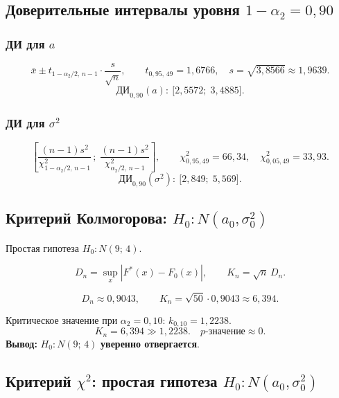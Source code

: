 \documentclass[12pt,a4paper]{article}
\newcommand{\xbar}{\bar{x}}
\begin{document}
	\subsection{Доверительные интервалы уровня \texorpdfstring{$1-\alpha_2 = 0{,}90$}{0.90}}
	
	\subsubsection*{ДИ для $a$}
	\[
	\xbar \pm t_{1-\alpha_2/2,\,n-1}\cdot\frac{s}{\sqrt{n}},
	\qquad
	t_{0{,}95,\,49} = 1{,}6766,\quad s = \sqrt{3{,}8566} \approx 1{,}9639.
	\]
	\[
	\boxed{
		\mathrm{ДИ}_{0{,}90}(a):\ \bigl[2{,}5572;\; 3{,}4885\bigr].
	}
	\]
	
	\subsubsection*{ДИ для $\sigma^2$}
	\[
	\left[\frac{(n-1)s^2}{\chi^2_{1-\alpha_2/2,\,n-1}}\,;\;
	\frac{(n-1)s^2}{\chi^2_{\alpha_2/2,\,n-1}}\right],
	\qquad
	\chi^2_{0{,}95,49} = 66{,}34,\quad
	\chi^2_{0{,}05,49} = 33{,}93.
	\]
	\[
	\boxed{
		\mathrm{ДИ}_{0{,}90}(\sigma^2):\ \bigl[2{,}849;\; 5{,}569\bigr].
	}
	\]
	
	\subsection{Критерий Колмогорова: \texorpdfstring{$H_0\colon N(a_0, \sigma_0^2)$}{}}
	
	Простая гипотеза $H_0\colon N(9;\,4)$.
	
	\[
	D_n = \sup_x |F^*(x) - F_0(x)|, \qquad
	K_n = \sqrt{n}\,D_n.
	\]
	
	\[
	D_n \approx 0{,}9043, \qquad K_n = \sqrt{50} \cdot 0{,}9043 \approx 6{,}394.
	\]
	
	Критическое значение при $\alpha_2 = 0{,}10$: $k_{0{,}10} = 1{,}2238$.
	\[
	K_n = 6{,}394 \gg 1{,}2238. \quad p\text{-значение} \approx 0.
	\]
	\textbf{Вывод:} $H_0\colon N(9;\,4)$ \textbf{уверенно отвергается}.
	
	\subsection{Критерий \texorpdfstring{$\chi^2$}{chi2}: простая гипотеза
		\texorpdfstring{$H_0\colon N(a_0,\sigma_0^2)$}{}}
	
\end{document}
